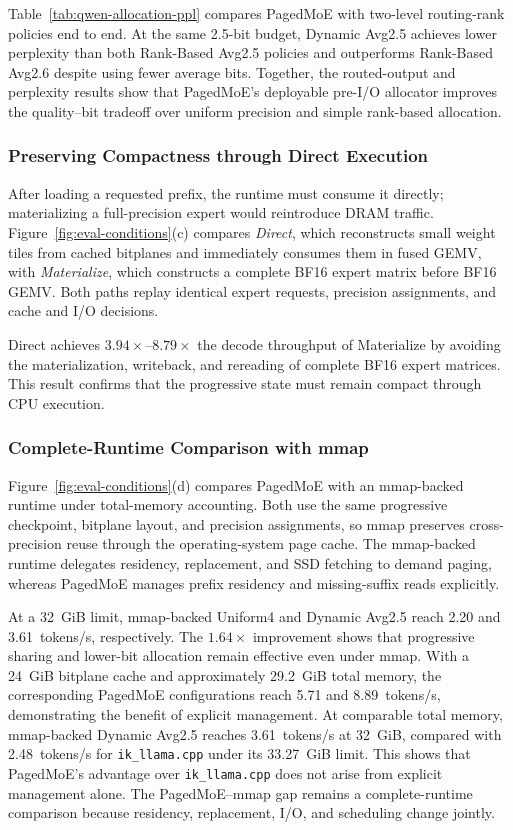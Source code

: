 \documentclass[sigconf, nonacm]{acmart}
\begin{document}
Table~\ref{tab:qwen-allocation-ppl} compares PagedMoE with two-level
routing-rank policies end to end. At the same 2.5-bit budget, Dynamic
Avg2.5 achieves lower perplexity than both Rank-Based Avg2.5 policies and 
outperforms Rank-Based Avg2.6 despite using fewer average bits. Together,
the routed-output and perplexity results show that PagedMoE's
deployable pre-I/O allocator improves the quality--bit tradeoff over
uniform precision and simple rank-based allocation.

\subsubsection{Preserving Compactness through Direct Execution}
\label{sec:eval-compact-execution}

After loading a requested prefix, the runtime must consume it directly;
materializing a full-precision expert would reintroduce DRAM traffic.
Figure~\ref{fig:eval-conditions}(c) compares \emph{Direct}, which
reconstructs small weight tiles from cached bitplanes and immediately
consumes them in fused GEMV, with \emph{Materialize}, which constructs
a complete BF16 expert matrix before BF16 GEMV. Both paths replay
identical expert requests, precision assignments, and cache and I/O
decisions.

Direct achieves \(3.94\times\)--\(8.79\times\) the decode throughput
of Materialize by avoiding the materialization, writeback, and
rereading of complete BF16 expert matrices. This result confirms that
the progressive state must remain compact through CPU execution.

\subsubsection{Complete-Runtime Comparison with mmap}
\label{sec:eval-explicit-runtime}

Figure~\ref{fig:eval-conditions}(d) compares PagedMoE with an
mmap-backed runtime under total-memory accounting. Both use the same
progressive checkpoint, bitplane layout, and precision assignments, so
mmap preserves cross-precision reuse through the operating-system page
cache. The mmap-backed runtime delegates residency, replacement, and SSD fetching
to demand paging, whereas PagedMoE manages prefix residency and
missing-suffix reads explicitly.

At a 32~GiB limit, mmap-backed Uniform4 and Dynamic Avg2.5 reach
2.20 and 3.61~tokens/s, respectively. The \(1.64\times\) improvement
shows that progressive sharing and lower-bit allocation remain
effective even under mmap. With a 24~GiB bitplane cache and approximately 29.2~GiB total
memory, the corresponding PagedMoE configurations reach 5.71 and
8.89~tokens/s, demonstrating the benefit of explicit management. At comparable total memory, mmap-backed Dynamic Avg2.5 reaches
3.61~tokens/s at 32~GiB, compared with 2.48~tokens/s for
\texttt{ik\_llama.cpp} under its 33.27~GiB limit. This shows that
PagedMoE's advantage over \texttt{ik\_llama.cpp} does not arise from
explicit management alone. The PagedMoE--mmap gap remains a complete-runtime comparison
because residency, replacement, I/O, and scheduling change jointly.
\end{document}
